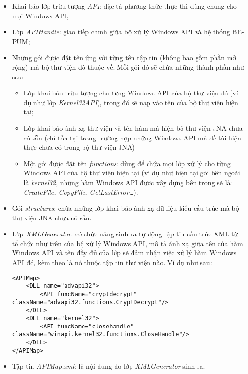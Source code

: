 \begin{itemize}
	\item Khai báo lớp trừu tượng \textit{API}: đặc tả phương thức thực thi dùng chung cho mọi Windows API;

	\item Lớp \textit{APIHandle}: giao tiếp chính giữa bộ xử lý Windows API và hệ thống BE-PUM;

	\item Những gói được đặt tên ứng với từng tên tập tin (không bao gồm phần mở rộng) mà bộ thư viện đó thuộc về. Mỗi gói đó sẽ chứa những thành phần như sau:

	\begin{itemize}
		\item Lớp khai báo trừu tượng cho từng Windows API của bộ thư viện đó (ví dụ như lớp \textit{Kernel32API}), trong đó sẽ nạp vào tên của bộ thư viện hiện tại;

		\item Lớp khai báo ánh xạ thư viện và tên hàm mà hiện bộ thư viện JNA chưa có sẵn (chỉ tồn tại trong trường hợp những Windows API mà đề tài hiện thực chưa có trong bộ thư viện JNA)

		\item Một gói được đặt tên \textit{functions}: dùng để chứa mọi lớp xử lý cho từng Windows API của bộ thư viện hiện tại (ví dụ như hiện tại gói bên ngoài là \textit{kernel32}, những hàm Windows API được xây dựng bên trong sẽ là: \textit{CreateFile, CopyFile, GetLastError…}).
	\end{itemize}

	\item Gói \textit{structures}: chứa những lớp khai báo ánh xạ dữ liệu kiểu cấu trúc mà bộ thư viện JNA chưa có sẵn.

	\item Lớp \textit{XMLGenerator}: có chức năng sinh ra tự động tập tin cấu trúc XML từ tổ chức như trên của bộ xử lý Windows API, mô tả ánh xạ giữa tên của hàm Windows API và tên đầy đủ của lớp sẽ đảm nhận việc xử lý hàm Windows API đó, kèm theo là nó thuộc tập tin thư viện nào. Ví dụ như sau:\\


\lstset{language=HTML}
\begin{lstlisting}
<APIMap>
	<DLL name="advapi32">
		<API funcName="cryptdecrypt" 
className="advapi32.functions.CryptDecrypt"/>
	</DLL>
	<DLL name="kernel32">
		<API funcName="closehandle" 
className="winapi.kernel32.functions.CloseHandle"/>
	</DLL>
</APIMap>
\end{lstlisting}

	\item Tập tin \textit{APIMap.xml}: là nội dung do lớp \textit{XMLGenerator} sinh ra.
\end{itemize}

